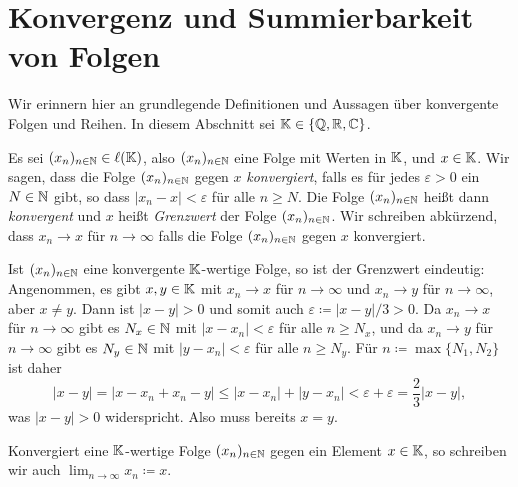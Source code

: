 \chapter{Konvergenz und Summierbarkeit von Folgen}\label{sec: sequences and series}
Wir erinnern hier an grundlegende Definitionen und Aussagen über konvergente Folgen und Reihen. In diesem Abschnitt sei $\mathbb{K} \in \{\mathbb{Q}, \mathbb{R}, \mathbb{C}\}$.


\begin{defi}
 Es sei $(x_n)_{n \in \mathbb{N}} \in \ell(\mathbb{K})$, also $(x_n)_{n \in \mathbb{N}}$ eine Folge mit Werten in $\mathbb{K}$, und $x \in \mathbb{K}$. Wir sagen, dass die Folge $(x_n)_{n \in \mathbb{N}}$ gegen $x$ \emph{konvergiert}, falls es für jedes $\varepsilon > 0$ ein $N \in \mathbb{N}$ gibt, so dass $|x_n - x| < \varepsilon$ für alle $n \geq N$. Die Folge $(x_n)_{n \in \mathbb{N}}$ heißt dann \emph{konvergent} und $x$ heißt \emph{Grenzwert} der Folge $(x_n)_{n \in \mathbb{N}}$. Wir schreiben abkürzend, dass $x_n \to x$ für $n \to \infty$ falls die Folge $(x_n)_{n \in \mathbb{N}}$ gegen $x$ konvergiert.
\end{defi}


\begin{bem}
 Ist $(x_n)_{n \in \mathbb{N}}$ eine konvergente $\mathbb{K}$-wertige Folge, so ist der Grenzwert eindeutig: Angenommen, es gibt $x,y \in \mathbb{K}$ mit $x_n \to x$ für $n \to \infty$ und $x_n \to y$ für $n \to \infty$, aber $x \neq y$. Dann ist $|x-y| > 0$ und somit auch $\varepsilon \coloneqq |x-y|/3 > 0$. Da $x_n \to x$ für $n \to \infty$ gibt es $N_x \in \mathbb{N}$ mit $|x-x_n| < \varepsilon$ für alle $n \geq N_x$, und da $x_n \to y$ für $n \to \infty$ gibt es $N_y \in \mathbb{N}$ mit $|y-x_n| < \varepsilon$ für alle $n \geq N_y$. Für $n \coloneqq \max \{N_1, N_2\}$ ist daher
 \[
  |x-y|
  = |x-x_n+x_n-y|
  \leq |x - x_n| + |y - x_n|
  < \varepsilon + \varepsilon
  = \frac{2}{3}|x-y|,
 \]
 was $|x-y| > 0$ widerspricht. Also muss bereits $x = y$.
 
 Konvergiert eine $\mathbb{K}$-wertige Folge $(x_n)_{n \in \mathbb{N}}$ gegen ein Element $x \in \mathbb{K}$, so schreiben wir auch $\lim_{n \to \infty} x_n \coloneqq x$.
\end{bem}


